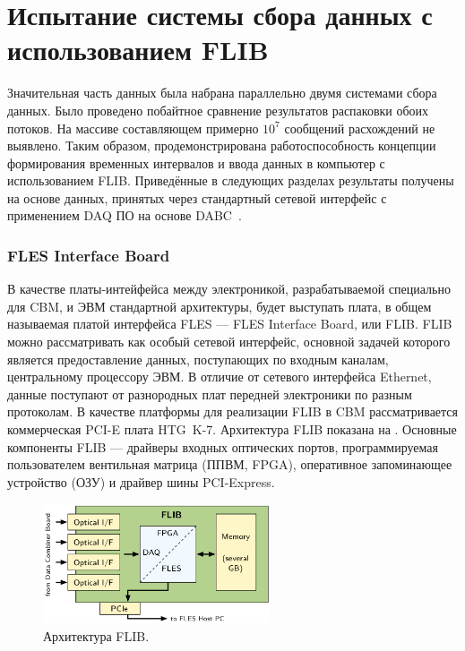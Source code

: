 \section{Испытание системы сбора данных с использованием FLIB}\label{sec:secFlibTests}

Значительная часть данных была набрана параллельно двумя системами сбора данных. Было проведено побайтное сравнение результатов распаковки обоих потоков. На массиве составляющем примерно $ 10^{7} $ сообщений расхождений не выявлено. Таким образом, продемонстрирована работоспособность концепции формирования временных интервалов и ввода данных в компьютер с использованием FLIB. Приведённые в следующих разделах результаты получены на основе данных, принятых через стандартный сетевой интерфейс с применением DAQ ПО на основе DABC~\cite{DABC}.

\subsubsection{FLES Interface Board}\label{sec:secFlib}

В качестве платы-интейфейса между электроникой, разрабатываемой специально для CBM, и ЭВМ стандартной архитектуры, будет выступать плата, в общем называемая платой интерфейса FLES --- FLES Interface Board, или FLIB. FLIB можно рассматривать как особый сетевой интерфейс, основной задачей которого является предоставление данных, поступающих по входным каналам, центральному процессору ЭВМ. В отличие от сетевого интерфейса Ethernet, данные поступают от разнородных плат передней электроники по разным протоколам. В качестве платформы для реализации FLIB в CBM рассматривается коммерческая PCI-E плата HTG~K-7. Архитектура FLIB показана на . Основные компоненты FLIB --- драйверы входных оптических портов, программируемая пользователем вентильная матрица (ППВМ, FPGA), оперативное запоминающее устройство (ОЗУ) и драйвер шины PCI-Express. 

\begin{figure}[H]
\centering
\includegraphics[width=0.6\textwidth]{pictures/FLIBarch.png}
\caption{Архитектура FLIB.}
\label{fig:FLIBarch}
\end{figure}